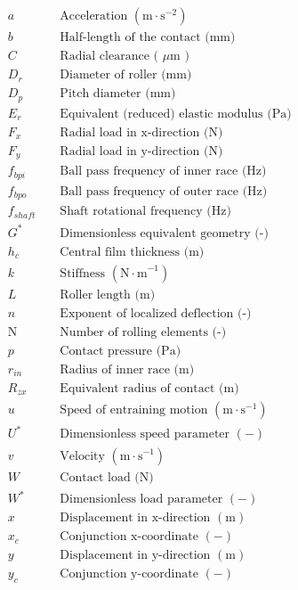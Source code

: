 \begin{align*}
	&a && \text { Acceleration }\left(\mathrm{m \cdot s}^{-2}\right) \\
	&b && \text { Half-length of the contact (mm) } \\
	&C && \text { Radial clearance ( } \mu \mathrm{m} \text { ) } \\
	&D_r && \text { Diameter of roller (mm) } \\
	&D_p && \text { Pitch diameter (mm) } \\
	&E_r && \text { Equivalent (reduced) elastic modulus (Pa) } \\
	&F_x && \text { Radial load in x-direction (N) } \\
	&F_y && \text { Radial load in y-direction (N) } \\
	&f_{b p i} && \text { Ball pass frequency of inner race (Hz) } \\
	&f_{b p o} && \text { Ball pass frequency of outer race (Hz) } \\
	&f_{s h a f t} && \text { Shaft rotational frequency (Hz) } \\
	&G^* && \text { Dimensionless equivalent geometry (-) } \\
	&h_c && \text { Central film thickness (m) } \\
	&k && \text { Stiffness }\left(\mathrm{N \cdot m}^{-1}\right) \\
	&L && \text { Roller length (m) } \\
	&n && \text { Exponent of localized deflection (-) } \\
	&\mathrm{N} && \text { Number of rolling elements (-) } \\
	&p && \text { Contact pressure (Pa) } \\
	&r_{i n} && \text { Radius of inner race (m) } \\
	&R_{z x} && \text { Equivalent radius of contact (m) } \\
	&u && \text { Speed of entraining motion }\left(\mathrm{m} \cdot \mathrm{s}^{-1}\right) \\
	&U^* && \text { Dimensionless speed parameter }(-) \\
	&v && \text { Velocity }\left(\mathrm{m} \cdot \mathrm{s}^{-1}\right) \\
	&W && \text { Contact load (N) } \\
	&W^* && \text { Dimensionless load parameter }(-) \\
	&x && \text { Displacement in x-direction }(\mathrm{m}) \\
	&x_c && \text { Conjunction x-coordinate }(-) \\
	&y && \text { Displacement in y-direction }(\mathrm{m}) \\
	&y_c && \text { Conjunction y-coordinate }(-) \\
\end{align*}
	
